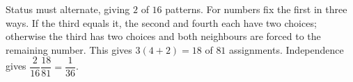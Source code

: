 Status must alternate, giving $2$ of $16$ patterns. For numbers fix the first in three ways. If the third equals it, the second and fourth each have two choices; otherwise the third has two choices and both neighbours are forced to the remaining number. This gives $3(4+2)=18$ of $81$ assignments. Independence gives $\dfrac{2}{16}\dfrac{18}{81}=\boxed{\dfrac{1}{36}}$.

